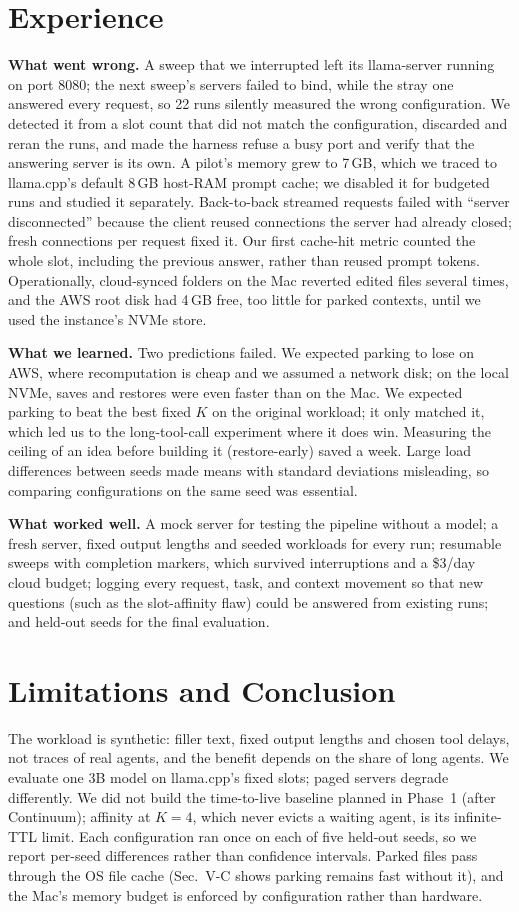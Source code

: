 \documentclass[conference,letterpaper]{IEEEtran}
\begin{document}
\section{Experience}
\textbf{What went wrong.} A sweep that we interrupted left its llama-server running on port 8080; the next sweep's servers failed to bind, while the stray one answered every request, so 22 runs silently measured the wrong configuration. We detected it from a slot count that did not match the configuration, discarded and reran the runs, and made the harness refuse a busy port and verify that the answering server is its own. A pilot's memory grew to 7\,GB, which we traced to llama.cpp's default 8\,GB host-RAM prompt cache; we disabled it for budgeted runs and studied it separately. Back-to-back streamed requests failed with ``server disconnected'' because the client reused connections the server had already closed; fresh connections per request fixed it. Our first cache-hit metric counted the whole slot, including the previous answer, rather than reused prompt tokens. Operationally, cloud-synced folders on the Mac reverted edited files several times, and the AWS root disk had 4\,GB free, too little for parked contexts, until we used the instance's NVMe store.

\textbf{What we learned.} Two predictions failed. We expected parking to lose on AWS, where recomputation is cheap and we assumed a network disk; on the local NVMe, saves and restores were even faster than on the Mac. We expected parking to beat the best fixed $K$ on the original workload; it only matched it, which led us to the long-tool-call experiment where it does win. Measuring the ceiling of an idea before building it (restore-early) saved a week. Large load differences between seeds made means with standard deviations misleading, so comparing configurations on the same seed was essential.

\textbf{What worked well.} A mock server for testing the pipeline without a model; a fresh server, fixed output lengths and seeded workloads for every run; resumable sweeps with completion markers, which survived interruptions and a \$3/day cloud budget; logging every request, task, and context movement so that new questions (such as the slot-affinity flaw) could be answered from existing runs; and held-out seeds for the final evaluation.

\section{Limitations and Conclusion}
The workload is synthetic: filler text, fixed output lengths and chosen tool delays, not traces of real agents, and the benefit depends on the share of long agents. We evaluate one 3B model on llama.cpp's fixed slots; paged servers degrade differently. We did not build the time-to-live baseline planned in Phase~1 (after Continuum); affinity at $K=4$, which never evicts a waiting agent, is its infinite-TTL limit. Each configuration ran once on each of five held-out seeds, so we report per-seed differences rather than confidence intervals. Parked files pass through the OS file cache (Sec.~V-C shows parking remains fast without it), and the Mac's memory budget is enforced by configuration rather than hardware.
\end{document}
